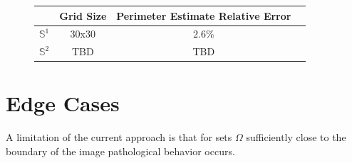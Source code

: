 \documentclass[12pt]{article}
\begin{document}
\begin{figure}[H]
	\centering
	\begin{tabular}{|c|c|c|c|}
		\hline
		&  Grid Size & Perimeter Estimate Relative Error  \\
		\hline
		$\mathbb{S}^1$ & 30x30 &  2.6\%  \\
		\hline
		$\mathbb{S}^2$ & TBD & TBD    \\
		\hline
	\end{tabular}
\end{figure}

\section{Edge Cases}

A limitation of the current approach is that for sets $\Omega$ sufficiently close to the boundary of the image pathological behavior occurs.



\end{document}
